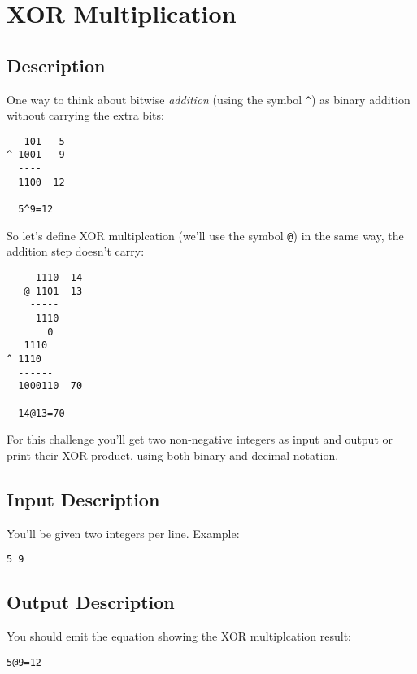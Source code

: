 \section{XOR Multiplication}

\subsection*{Description}\label{description-42}

One way to think about bitwise \emph{addition} (using the symbol
\texttt{\^{}}) as binary addition without carrying the extra bits:

\begin{lstlisting}
   101   5
^ 1001   9
  ----  
  1100  12

  5^9=12
\end{lstlisting}

So let's define XOR multiplcation (we'll use the symbol \texttt{@}) in
the same way, the addition step doesn't carry:

\begin{lstlisting}
     1110  14
   @ 1101  13
    -----
     1110
       0
   1110
^ 1110 
  ------
  1000110  70

  14@13=70
\end{lstlisting}

For this challenge you'll get two non-negative integers as input and
output or print their XOR-product, using both binary and decimal
notation.

\subsection*{Input Description}\label{input-description-30}

You'll be given two integers per line. Example:

\begin{lstlisting}
5 9
\end{lstlisting}

\subsection*{Output Description}\label{output-description-31}

You should emit the equation showing the XOR multiplcation result:

\begin{lstlisting}
5@9=12
\end{lstlisting}

